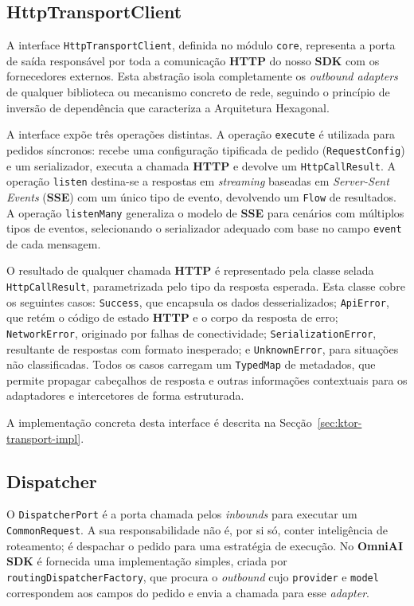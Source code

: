     \subsection{HttpTransportClient}
    \label{subsec:http-transport-client}

    A interface \texttt{HttpTransportClient}, definida no módulo \texttt{core}, representa a porta de saída responsável por toda a comunicação \textbf{HTTP} do nosso \textbf{SDK} com os fornecedores externos. Esta abstração isola completamente os \textit{outbound adapters} de qualquer biblioteca ou mecanismo concreto de rede, seguindo o princípio de inversão de dependência que caracteriza a Arquitetura Hexagonal.

    A interface expõe três operações distintas. A operação \texttt{execute} é utilizada para pedidos síncronos: recebe uma configuração tipificada de pedido (\texttt{RequestConfig}) e um serializador, executa a chamada \textbf{HTTP} e devolve um \texttt{HttpCallResult}. A operação \texttt{listen} destina-se a respostas em \textit{streaming} baseadas em \textit{Server-Sent Events} (\textbf{SSE}) com um único tipo de evento, devolvendo um \texttt{Flow} de resultados. A operação \texttt{listenMany} generaliza o modelo de \textbf{SSE} para cenários com múltiplos tipos de eventos, selecionando o serializador adequado com base no campo \texttt{event} de cada mensagem.

    O resultado de qualquer chamada \textbf{HTTP} é representado pela classe selada \texttt{HttpCallResult}, parametrizada pelo tipo da resposta esperada. Esta classe cobre os seguintes casos: \texttt{Success}, que encapsula os dados desserializados; \texttt{ApiError}, que retém o código de estado \textbf{HTTP} e o corpo da resposta de erro; \texttt{NetworkError}, originado por falhas de conectividade; \texttt{SerializationError}, resultante de respostas com formato inesperado; e \texttt{UnknownError}, para situações não classificadas. Todos os casos carregam um \texttt{TypedMap} de metadados, que permite propagar cabeçalhos de resposta e outras informações contextuais para os adaptadores e intercetores de forma estruturada.

    A implementação concreta desta interface é descrita na Secção~\ref{sec:ktor-transport-impl}.

    \subsection{Dispatcher}
    O \texttt{DispatcherPort} é a porta chamada pelos \textit{inbounds} para executar um \texttt{CommonRequest}. A sua responsabilidade não é, por si só, conter inteligência de roteamento; é despachar o pedido para uma estratégia de execução. No \textbf{OmniAI SDK} é fornecida uma implementação simples, criada por \texttt{routingDispatcherFactory}, que procura o \textit{outbound} cujo \texttt{provider} e \texttt{model} correspondem aos campos do pedido e envia a chamada para esse \textit{adapter}.

